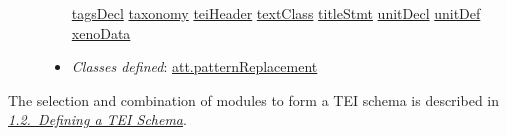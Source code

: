 \begin{description}
\begin{itemize}
\hyperref[TEI.tagsDecl]{tagsDecl} \hyperref[TEI.taxonomy]{taxonomy} \hyperref[TEI.teiHeader]{teiHeader} \hyperref[TEI.textClass]{textClass} \hyperref[TEI.titleStmt]{titleStmt} \hyperref[TEI.unitDecl]{unitDecl} \hyperref[TEI.unitDef]{unitDef} \hyperref[TEI.xenoData]{xenoData}
\item {\itshape Classes defined}: \hyperref[TEI.att.patternReplacement]{att.patternReplacement}
\end{itemize} 
\end{description}   The selection and combination of modules to form a TEI schema is described in \textit{\hyperref[STIN]{1.2.\ Defining a TEI Schema}}.